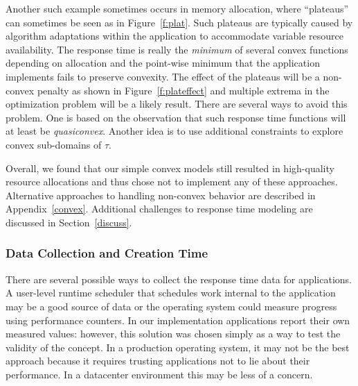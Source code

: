 Another such example sometimes occurs in memory allocation, where ``plateaus'' can sometimes be seen as in Figure~\ref{f:plat}. Such plateaus are typically caused by algorithm adaptations within the application to accommodate variable resource availability.  The response time is really the \emph{minimum} of several convex functions depending on allocation and the point-wise minimum that the application implements fails to preserve convexity.  The effect of the plateaus will be a non-convex penalty as shown in Figure~\ref{f:plateffect} and multiple extrema in the optimization problem will be a likely result. There are several ways to avoid this problem.  One is based on the observation that such response time functions will at least be \emph{quasiconvex}.  Another idea is to use additional constraints to explore convex sub-domains of $\tau$.  


Overall, we found that our simple convex models still resulted in high-quality resource allocations and thus chose not to implement any of these approaches.  Alternative approaches to handling non-convex behavior are described in Appendix~\ref{convex}. Additional challenges to response time modeling are discussed in Section~\ref{discuss}.

%
%
%


\subsubsection*{Data Collection and Creation Time}
There are several possible ways to collect the response time data for applications. A user-level runtime scheduler that schedules work internal to the application may be a good source of data or the operating system could measure progress using performance counters.  In our implementation applications report their own measured values: however, this solution was chosen simply as a way to test the validity of the concept.  In a production operating system, it may not be the best approach because it requires trusting applications not to lie about their performance.  In a datacenter environment this may be less of a concern.

